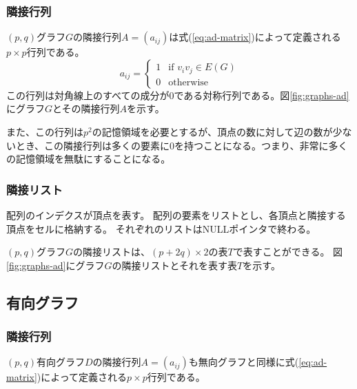 \documentclass[dvipdfmx, twocolumn, 11pt]{jsarticle}
\begin{document}
        \subsubsection{隣接行列}
            $(p, q)$グラフ$G$の隣接行列$A = (a_{ij})$は式(\ref{eq:ad-matrix})によって定義される$p \times p$行列である。
            \begin{equation}
                \label{eq:ad-matrix}
                a_{ij} =
                \begin{cases}
                    1 & \text{if $v_i v_j \in E(G)$} \\
                    0 & \text{otherwise}
                \end{cases}
            \end{equation}
            この行列は対角線上のすべての成分が0である対称行列である。図\ref{fig:graphs-ad}にグラフ$G$とその隣接行列$A$を示す。

            また、この行列は$p^2$の記憶領域を必要とするが、頂点の数に対して辺の数が少ないとき、この隣接行列は多くの要素に0を持つことになる。つまり、非常に多くの記憶領域を無駄にすることになる。

        \subsubsection{隣接リスト}
            配列のインデクスが頂点を表す。
            配列の要素をリストとし、各頂点と隣接する頂点をセルに格納する。
            それぞれのリストはNULLポインタで終わる。

            $(p, q)$グラフ$G$の隣接リストは、$(p + 2q) \times 2$の表$T$で表すことができる。
            図\ref{fig:graphs-ad}にグラフ$G$の隣接リストとそれを表す表$T$を示す。
        


    \subsection{有向グラフ}
        \subsubsection{隣接行列}
            $(p, q)$有向グラフ$D$の隣接行列$A = (a_{ij})$も無向グラフと同様に式(\ref{eq:ad-matrix})によって定義される$p \times p$行列である。
\end{document}

